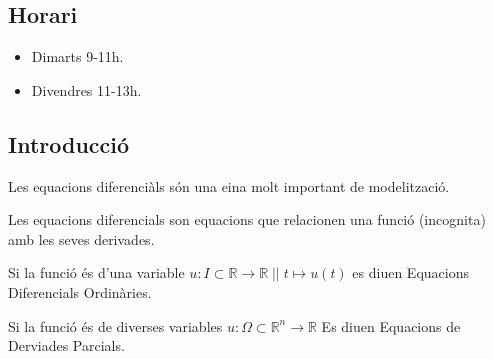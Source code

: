 \documentclass[../main.tex]{subfiles}
\begin{document}
\subsection*{Horari}
\begin{itemize}
    \item Dimarts 9-11h.
    \item Divendres 11-13h.
\end{itemize}
\setcounter{subsection}{-1}
\subsection{Introducció}
Les equacions diferenciàls són una eina molt important de modelització.
\begin{definicio}
    Les equacions diferencials son equacions que relacionen una funció (incognita) amb les seves
    derivades.
\end{definicio}
\begin{definicio}
    Si la funció és d'una variable $u: I \subset \mathbb{R} \rightarrow \mathbb{R}\;||\;t \mapsto u(t)$
    es diuen Equacions Diferencials Ordinàries.
\end{definicio}
\begin{definicio}
    Si la funció és de diverses variables $u : \Omega \subset \mathbb{R}^n \to \mathbb{R}$ Es diuen
    Equacions de Derviades Parcials.
\end{definicio}
\end{document}
